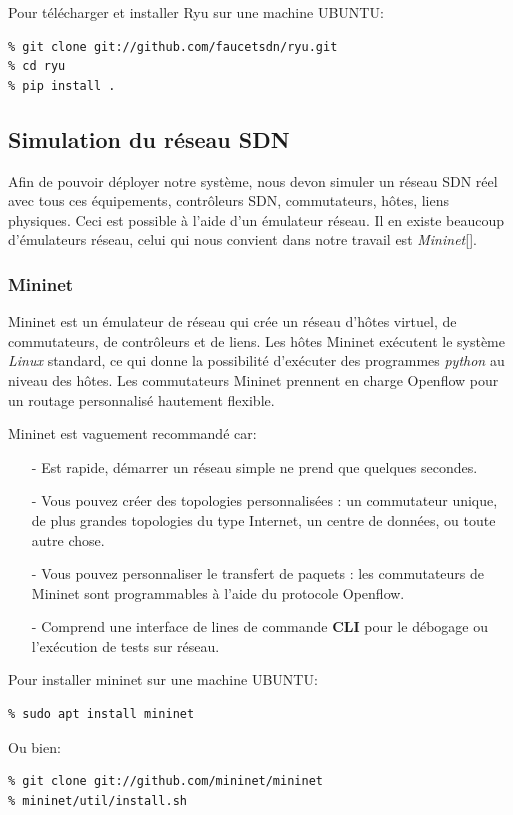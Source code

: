 \noindent Pour télécharger et installer Ryu sur une machine UBUNTU:
\begin{verbatim}
% git clone git://github.com/faucetsdn/ryu.git
% cd ryu
% pip install .
\end{verbatim}


\subsection{Simulation du réseau SDN}
Afin de pouvoir déployer notre système, nous devon simuler un réseau SDN réel avec tous ces équipements, contrôleurs SDN, commutateurs, hôtes, liens physiques. Ceci est possible à l'aide d'un émulateur réseau. Il en existe beaucoup d'émulateurs réseau, celui qui nous convient dans notre travail est \textit{Mininet}[\cite{28}].

\subsubsection{Mininet}
Mininet est un émulateur de réseau qui crée un réseau d’hôtes virtuel, de commutateurs, de contrôleurs et de liens. Les hôtes Mininet exécutent le système \textit{Linux} standard, ce qui donne la possibilité d'exécuter des programmes \textit{python} au niveau des hôtes. Les commutateurs Mininet prennent en charge Openflow pour un routage personnalisé hautement flexible.

\noindent Mininet est vaguement recommandé car:\\
\begin{itemize}
\item[-] Est rapide, démarrer un réseau simple ne prend que quelques secondes.\\
\item[-] Vous pouvez créer des topologies personnalisées : un commutateur unique, de plus grandes topologies du type Internet, un centre de données, ou toute autre chose.\\
\item[-] Vous pouvez personnaliser le transfert de paquets : les commutateurs de Mininet sont programmables à l’aide du protocole Openflow.\\
\item[-] Comprend une interface de lines de commande \textbf{CLI} pour le débogage ou l’exécution de tests sur réseau.\\
\end{itemize}

\noindent Pour installer mininet sur une machine UBUNTU:
\begin{verbatim}
% sudo apt install mininet
\end{verbatim}
Ou bien: 
\begin{verbatim}
% git clone git://github.com/mininet/mininet
% mininet/util/install.sh
\end{verbatim}

